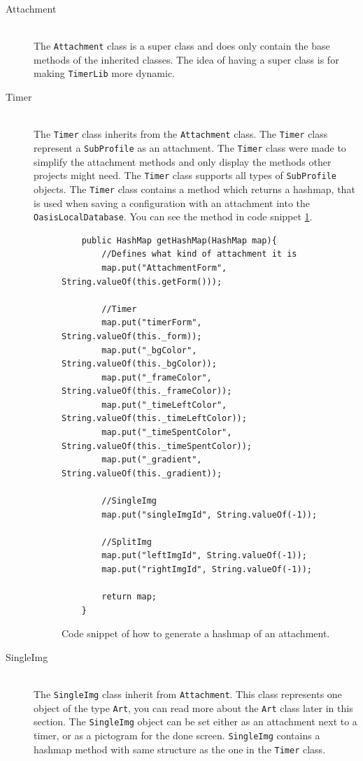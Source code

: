 \begin{description}
	\item[Attachment] \hfill \\
  The \texttt{Attachment} class is a super class and does only contain the base methods of the inherited classes. The idea of having a super class is for making \texttt{TimerLib} more dynamic.
	
  \item[Timer] \hfill \\
  The \texttt{Timer} class inherits from the \texttt{Attachment} class. The \texttt{Timer} class represent a \texttt{SubProfile} as an attachment. The \texttt{Timer} class were made to simplify the attachment methods and only display the methods other projects might need. The \texttt{Timer} class supports all types of \texttt{SubProfile} objects. The \texttt{Timer} class contains a method which returns a hashmap, that is used when saving a configuration with an attachment into the \texttt{OasisLocalDatabase}. You can see the method in code snippet \ref{code:timerhash}.
	
		\begin{figure}[H]
\begin{lstlisting}
	public HashMap getHashMap(HashMap map){
		//Defines what kind of attachment it is
		map.put("AttachmentForm", String.valueOf(this.getForm()));
		
		//Timer
		map.put("timerForm", String.valueOf(this._form));
		map.put("_bgColor", String.valueOf(this._bgColor));
		map.put("_frameColor", String.valueOf(this._frameColor));
		map.put("_timeLeftColor", String.valueOf(this._timeLeftColor));
		map.put("_timeSpentColor", String.valueOf(this._timeSpentColor));
		map.put("_gradient", String.valueOf(this._gradient));
		
		//SingleImg
		map.put("singleImgId", String.valueOf(-1));
		
		//SplitImg
		map.put("leftImgId", String.valueOf(-1));
		map.put("rightImgId", String.valueOf(-1));
		
		return map;
	}
\end{lstlisting}
\caption{Code snippet of how to generate a hashmap of an attachment.}%
\label{code:timerhash}%
\end{figure}
	
  \item[SingleImg] \hfill \\
  The \texttt{SingleImg} class inherit from \texttt{Attachment}. This class represents one object of the type \texttt{Art}, you can read more about the \texttt{Art} class later in this section. The \texttt{SingleImg} object can be set either as an attachment next to a timer, or as a pictogram for the done screen. \texttt{SingleImg} contains a hashmap method with same structure as the one in the \texttt{Timer} class.
	

\end{description}
